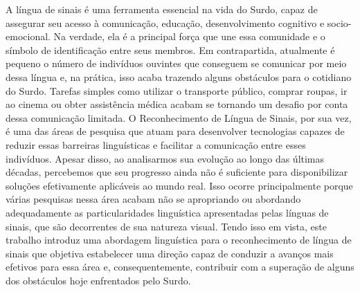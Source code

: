 \begin{resumo}[Resumo]
  \noindent
  A língua de sinais é uma ferramenta essencial na vida do Surdo, capaz de assegurar seu acesso à comunicação, educação, desenvolvimento cognitivo e socio-emocional.
  Na verdade, ela é a principal força que une essa comunidade e o símbolo de identificação entre seus membros.
  Em contrapartida, atualmente é pequeno o número de indivíduos ouvintes que conseguem se comunicar por meio dessa língua e, na prática, isso acaba trazendo alguns obstáculos para o cotidiano do Surdo.
  Tarefas simples como utilizar o transporte público, comprar roupas, ir ao cinema ou obter assistência médica acabam se tornando um desafio por conta dessa comunicação limitada.
  O Reconhecimento de Língua de Sinais, por sua vez, é uma das áreas de pesquisa que atuam para desenvolver tecnologias capazes de reduzir essas barreiras linguísticas e facilitar a comunicação entre esses indivíduos.
  Apesar disso, ao analisarmos sua evolução ao longo das últimas décadas, percebemos que seu progresso ainda não é suficiente para disponibilizar soluções efetivamente aplicáveis ao mundo real.
  Isso ocorre principalmente porque várias pesquisas nessa área acabam não se apropriando ou abordando adequadamente as particularidades linguística apresentadas pelas línguas de sinais, que são decorrentes de sua natureza visual.
  Tendo isso em vista, este trabalho introduz uma abordagem linguística para o reconhecimento de língua de sinais que objetiva estabelecer uma direção capaz de conduzir a avanços mais efetivos para essa área e, consequentemente, contribuir com a superação de alguns dos obstáculos hoje enfrentados pelo Surdo.





\end{resumo}
